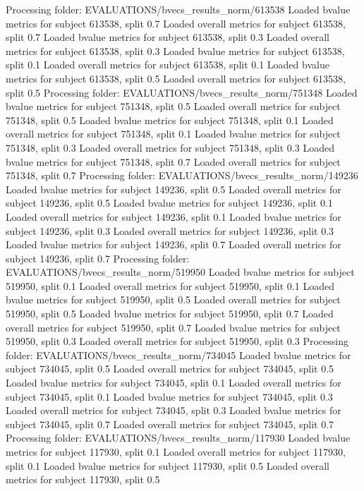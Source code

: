 Processing folder: EVALUATIONS/bvecs_results_norm/613538
Loaded bvalue metrics for subject 613538, split 0.7
Loaded overall metrics for subject 613538, split 0.7
Loaded bvalue metrics for subject 613538, split 0.3
Loaded overall metrics for subject 613538, split 0.3
Loaded bvalue metrics for subject 613538, split 0.1
Loaded overall metrics for subject 613538, split 0.1
Loaded bvalue metrics for subject 613538, split 0.5
Loaded overall metrics for subject 613538, split 0.5
Processing folder: EVALUATIONS/bvecs_results_norm/751348
Loaded bvalue metrics for subject 751348, split 0.5
Loaded overall metrics for subject 751348, split 0.5
Loaded bvalue metrics for subject 751348, split 0.1
Loaded overall metrics for subject 751348, split 0.1
Loaded bvalue metrics for subject 751348, split 0.3
Loaded overall metrics for subject 751348, split 0.3
Loaded bvalue metrics for subject 751348, split 0.7
Loaded overall metrics for subject 751348, split 0.7
Processing folder: EVALUATIONS/bvecs_results_norm/149236
Loaded bvalue metrics for subject 149236, split 0.5
Loaded overall metrics for subject 149236, split 0.5
Loaded bvalue metrics for subject 149236, split 0.1
Loaded overall metrics for subject 149236, split 0.1
Loaded bvalue metrics for subject 149236, split 0.3
Loaded overall metrics for subject 149236, split 0.3
Loaded bvalue metrics for subject 149236, split 0.7
Loaded overall metrics for subject 149236, split 0.7
Processing folder: EVALUATIONS/bvecs_results_norm/519950
Loaded bvalue metrics for subject 519950, split 0.1
Loaded overall metrics for subject 519950, split 0.1
Loaded bvalue metrics for subject 519950, split 0.5
Loaded overall metrics for subject 519950, split 0.5
Loaded bvalue metrics for subject 519950, split 0.7
Loaded overall metrics for subject 519950, split 0.7
Loaded bvalue metrics for subject 519950, split 0.3
Loaded overall metrics for subject 519950, split 0.3
Processing folder: EVALUATIONS/bvecs_results_norm/734045
Loaded bvalue metrics for subject 734045, split 0.5
Loaded overall metrics for subject 734045, split 0.5
Loaded bvalue metrics for subject 734045, split 0.1
Loaded overall metrics for subject 734045, split 0.1
Loaded bvalue metrics for subject 734045, split 0.3
Loaded overall metrics for subject 734045, split 0.3
Loaded bvalue metrics for subject 734045, split 0.7
Loaded overall metrics for subject 734045, split 0.7
Processing folder: EVALUATIONS/bvecs_results_norm/117930
Loaded bvalue metrics for subject 117930, split 0.1
Loaded overall metrics for subject 117930, split 0.1
Loaded bvalue metrics for subject 117930, split 0.5
Loaded overall metrics for subject 117930, split 0.5
